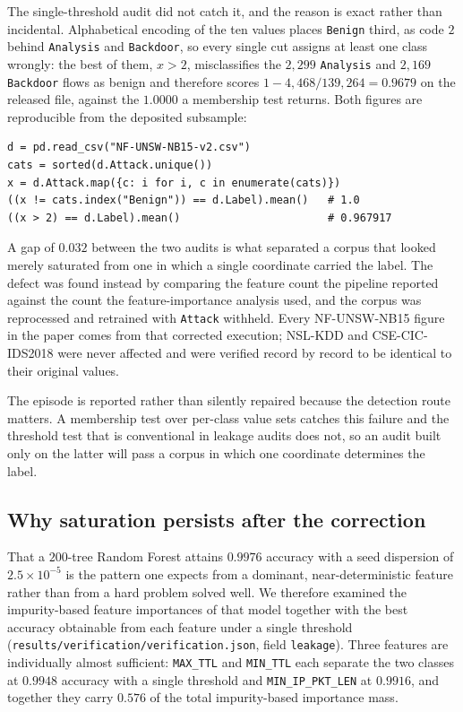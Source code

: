 \documentclass[11pt,a4paper]{article}
\begin{document}
The single-threshold audit did not catch it, and the reason is exact
rather than incidental. Alphabetical encoding of the ten values places
\texttt{Benign} third, as code $2$ behind \texttt{Analysis} and
\texttt{Backdoor}, so every single cut assigns at least one class
wrongly: the best of them, $x>2$, misclassifies the $2{,}299$
\texttt{Analysis} and $2{,}169$ \texttt{Backdoor} flows as benign and
therefore scores $1-4{,}468/139{,}264=0.9679$ on the released file,
against the $1.0000$ a membership test returns. Both figures are
reproducible from the deposited subsample:

\begin{verbatim}
d = pd.read_csv("NF-UNSW-NB15-v2.csv")
cats = sorted(d.Attack.unique())
x = d.Attack.map({c: i for i, c in enumerate(cats)})
((x != cats.index("Benign")) == d.Label).mean()   # 1.0
((x > 2) == d.Label).mean()                       # 0.967917
\end{verbatim}

\noindent A gap of $0.032$ between the two audits is what separated a
corpus that looked merely saturated from one in which a single
coordinate carried the label. The defect
was found instead by comparing the feature count the pipeline reported
against the count the feature-importance analysis used, and the corpus
was reprocessed and retrained with \texttt{Attack} withheld. Every
NF-UNSW-NB15 figure in the paper comes from that corrected execution;
NSL-KDD and CSE-CIC-IDS2018 were never affected and were verified
record by record to be identical to their original values.

The episode is reported rather than silently repaired because the
detection route matters. A membership test over per-class value sets
catches this failure and the threshold test that is conventional in
leakage audits does not, so an audit built only on the latter will pass
a corpus in which one coordinate determines the label.

\subsection{Why saturation persists after the correction}

That a $200$-tree Random Forest attains $0.9976$ accuracy with a
seed dispersion of $2.5\times10^{-5}$ is the pattern one expects from a
dominant, near-deterministic feature rather than from a hard problem
solved well. We therefore examined the impurity-based feature
importances of that model together with the best accuracy obtainable
from each feature under a single threshold
(\texttt{results/verification/verification.json}, field
\texttt{leakage}). Three features are individually almost sufficient:
\texttt{MAX\_TTL} and \texttt{MIN\_TTL} each separate the two classes
at $0.9948$ accuracy with a single threshold and
\texttt{MIN\_IP\_PKT\_LEN} at $0.9916$, and together they carry $0.576$
of the total impurity-based importance mass.
\end{document}
